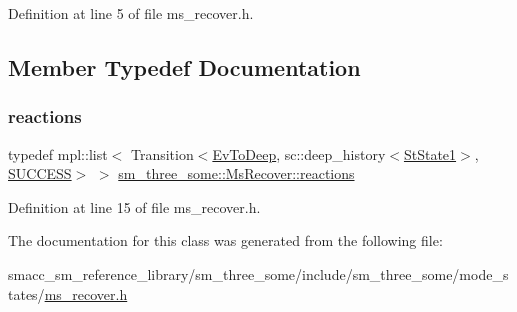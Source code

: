 Definition at line 5 of file ms\+\_\+recover.\+h.



\subsection{Member Typedef Documentation}
\mbox{\label{classsm__three__some_1_1MsRecover_aedc7f6fc4e95c1567e3262381b4bafce}} 
\subsubsection{\texorpdfstring{reactions}{reactions}}
{\footnotesize\ttfamily typedef mpl\+::list$<$ Transition$<$\hyperlink{structsm__three__some_1_1EvToDeep}{Ev\+To\+Deep}, sc\+::deep\+\_\+history$<$\hyperlink{structsm__three__some_1_1StState1}{St\+State1}$>$, \hyperlink{classSUCCESS}{S\+U\+C\+C\+E\+SS}$>$ $>$ \hyperlink{classsm__three__some_1_1MsRecover_aedc7f6fc4e95c1567e3262381b4bafce}{sm\+\_\+three\+\_\+some\+::\+Ms\+Recover\+::reactions}}



Definition at line 15 of file ms\+\_\+recover.\+h.



The documentation for this class was generated from the following file\+:\begin{DoxyCompactItemize}
\item 
smacc\+\_\+sm\+\_\+reference\+\_\+library/sm\+\_\+three\+\_\+some/include/sm\+\_\+three\+\_\+some/mode\+\_\+states/\hyperlink{ms__recover_8h}{ms\+\_\+recover.\+h}\end{DoxyCompactItemize}
